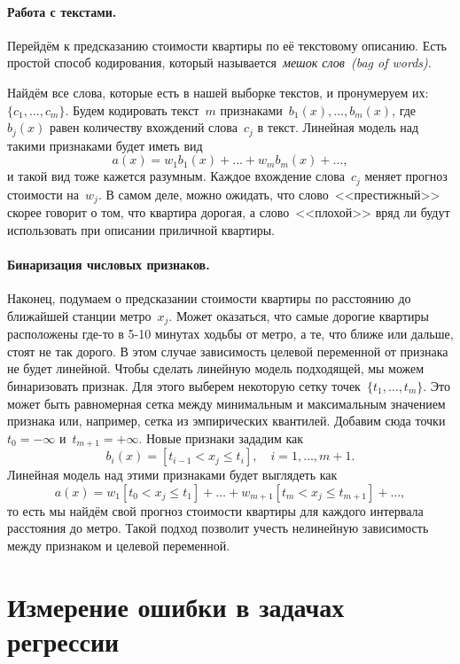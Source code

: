 \documentclass[12pt,fleqn]{article}
\begin{document}
\paragraph{Работа с текстами.}

Перейдём к предсказанию стоимости квартиры по её текстовому описанию.
Есть простой способ кодирования, который называется~\emph{мешок слов~(bag of words)}.

Найдём все слова, которые есть в нашей выборке текстов, и пронумеруем их:~$\{c_1, \dots, c_m\}$.
Будем кодировать текст~$m$ признаками~$b_1(x), \dots, b_m(x)$, где~$b_j(x)$ равен
количеству вхождений слова~$c_j$ в текст.
Линейная модель над такими признаками будет иметь вид
\[
    a(x)
    =
    w_1 b_1(x)
    +
    \dots
    +
    w_m b_m(x)
    +
    \dots,
\]
и такой вид тоже кажется разумным.
Каждое вхождение слова~$c_j$ меняет прогноз стоимости на~$w_j$.
В самом деле, можно ожидать, что слово~<<престижный>> скорее говорит о том,
что квартира дорогая, а слово~<<плохой>> вряд ли будут использовать при описании
приличной квартиры.

\paragraph{Бинаризация числовых признаков.}

Наконец, подумаем о предсказании стоимости квартиры по расстоянию до ближайшей станции метро~$x_j$.
Может оказаться, что самые дорогие квартиры расположены где-то в 5-10 минутах ходьбы от метро,
а те, что ближе или дальше, стоят не так дорого.
В этом случае зависимость целевой переменной от признака не будет линейной.
Чтобы сделать линейную модель подходящей, мы можем бинаризовать признак.
Для этого выберем некоторую сетку точек~$\{t_1, \dots, t_m\}$.
Это может быть равномерная сетка между минимальным и максимальным значением признака или,
например, сетка из эмпирических квантилей.
Добавим сюда точки~$t_0 = -\infty$ и~$t_{m+1} = +\infty$.
Новые признаки зададим как
\[
    b_i(x)
    =
    [t_{i - 1} < x_j \leq t_{i}],
    \quad
    i = 1, \dots, m+1.
\]
Линейная модель над этими признаками будет выглядеть как
\[
    a(x)
    =
    w_1 [t_{0} < x_j \leq t_{1}]
    +
    \dots
    +
    w_{m+1} [t_{m} < x_j \leq t_{m+1}]
    +
    \dots,
\]
то есть мы найдём свой прогноз стоимости квартиры для каждого интервала расстояния до метро.
Такой подход позволит учесть нелинейную зависимость между признаком и целевой переменной.

\section{Измерение ошибки в задачах регрессии}
\end{document}
